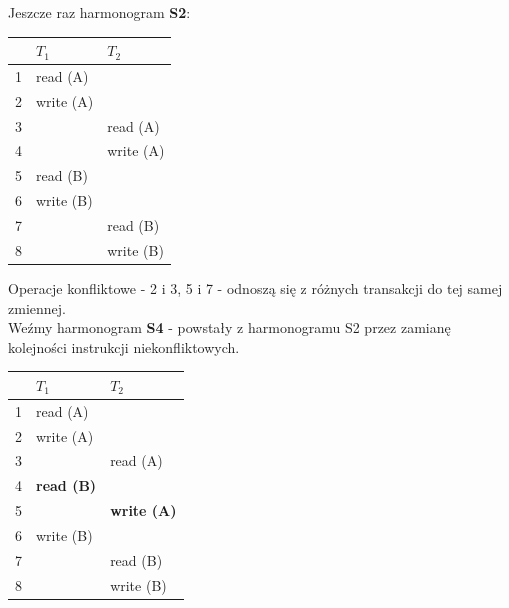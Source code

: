 \documentclass[12pt]{article}
\begin{document}
    \noindent Jeszcze raz harmonogram \textbf{S2}:
    \begin{table}[H]
        \begin{center}
            \begin{tabular}{| p{0.8cm} | p{6cm} | p{6cm} |}
                \hline
                & $T_1$ & $T_2$\\
                \hline
                \hline
                1 & read (A) &\\
                \hline
                2 & write (A) &\\
                \hline
                3 & & read (A)\\
                \hline
                4 & & write (A)\\
                \hline
                5 & read (B) &\\
                \hline
                6 & write (B) &\\
                \hline
                7 & & read (B)\\
                \hline
                8 & & write (B)\\
                \hline
            \end{tabular}
        \end{center}
    \end{table}

    Operacje konfliktowe - 2 i 3, 5 i 7 - odnoszą się z różnych transakcji do tej samej zmiennej.\\

    \noindent Weźmy harmonogram \textbf{S4} - powstały z harmonogramu S2 przez zamianę kolejności instrukcji niekonfliktowych.
    \begin{table}[H]
        \begin{center}
            \begin{tabular}{| p{0.8cm} | p{6cm} | p{6cm} |}
                \hline
                & $T_1$ & $T_2$\\
                \hline
                \hline
                1 & read (A) &\\
                \hline
                2 & write (A) &\\
                \hline
                3 & & read (A)\\
                \hline
                4 & \textbf{read (B)} &\\
                \hline
                5 & & \textbf{write (A)}\\
                \hline
                6 & write (B) &\\
                \hline
                7 & & read (B)\\
                \hline
                8 & & write (B)\\
                \hline
            \end{tabular}
        \end{center}
    \end{table}
\end{document}
